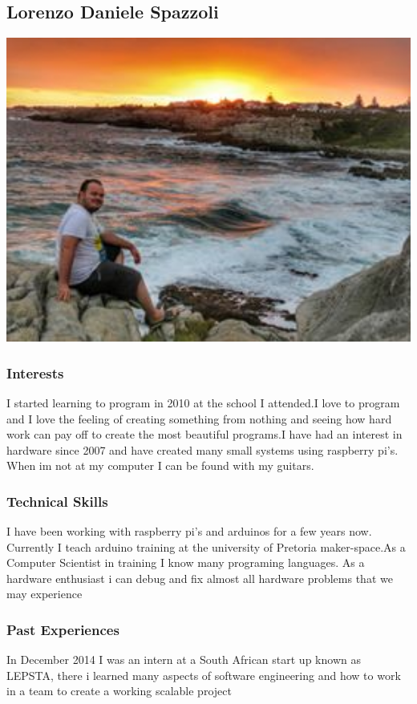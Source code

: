 \documentclass[a4paper,12pt]{article}
\begin{document}
		\subsection{Lorenzo Daniele Spazzoli}
		\includegraphics[width=1\textwidth]{./Pictures/lorenzo.jpg}\\
			\subsubsection{Interests}
			I started learning to program in 2010 at the school I attended.I love to program and I love the feeling of creating something from nothing and seeing how hard work can pay off to create the most beautiful programs.I have had an interest in hardware since 2007 and have created many small systems using raspberry pi's. When im not at my computer I can be found with my guitars.  
			\subsubsection{Technical Skills}
			I have been working with raspberry pi's and arduinos for a few years now. Currently I teach arduino training at the university of Pretoria maker-space.As a Computer Scientist in training I know many programing languages. As a hardware enthusiast i can debug and fix almost all hardware problems that we may experience
			\subsubsection{Past Experiences}
			In December 2014 I was an intern at a South African start up known as LEPSTA, there i learned many aspects of software engineering and how to work in a team to create a working scalable project
\end{document}
